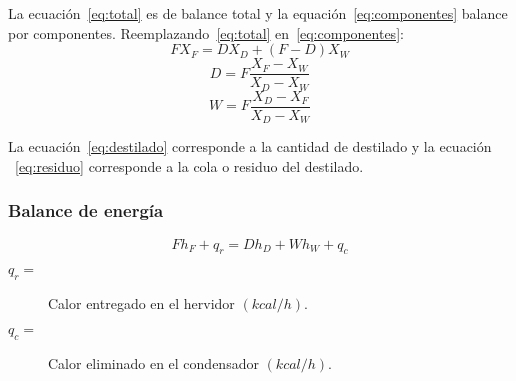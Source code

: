 \documentclass[11pt,openany]{book}
\begin{document}
La ecuación~\ref{eq:total} es de balance total y la equación~\ref{eq:componentes}
balance por componentes. Reemplazando~\ref{eq:total} en~\ref{eq:componentes}: 
\begin{equation*}F X_F = D X_D + (F-D) X_W\end{equation*}
\begin{equation} D=F \frac{X_F - X_W}{X_D-X_W}\label{eq:destilado}\end{equation}
\begin{equation}W=F \frac{X_D - X_F}{X_D-X_W}\label{eq:residuo}\end{equation}

  La ecuación~\ref{eq:destilado} corresponde a la cantidad de destilado y 
  la ecuación ~\ref{eq:residuo} corresponde a la cola o residuo del destilado.
  
\subsubsection{Balance de energía}
\begin{equation}F h_F +q_r = D h_D + W h_W + q_c\end{equation}


\begin{description}
\item [$q_r=$] {Calor entregado en el hervidor $(kcal/h)$.}
\item [$q_c=$] {Calor eliminado en el condensador $(kcal/h)$.}
\end{description}
\end{document}
